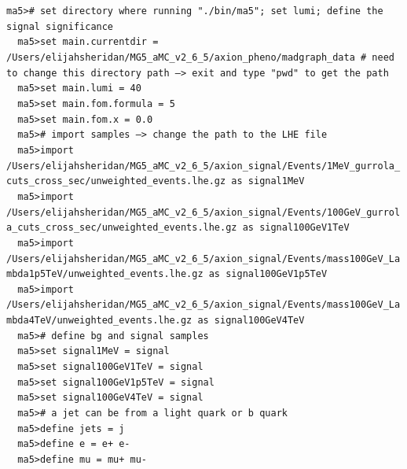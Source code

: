 \documentclass[a4paper, 10pt]{article}
\begin{document}
\texttt{ma5>\# set directory where running "./\-bin/\-ma5"; set lumi; define the signal significance\\
}
\texttt{ }\texttt{ }\texttt{ma5>set main.currentdir = /\-Users/\-elijahsheridan/\-MG5\_aMC\_v2\_6\_5/\-axion\_pheno/\-madgraph\_data \# need to change this directory path --> exit and type "pwd" to get the path\\
}
\texttt{ }\texttt{ }\texttt{ma5>set main.lumi = 40\\
}
\texttt{ }\texttt{ }\texttt{ma5>set main.fom.formula = 5\\
}
\texttt{ }\texttt{ }\texttt{ma5>set main.fom.x = 0.0\\
}
\texttt{ }\texttt{ }\texttt{ma5>\# import samples --> change the path to the LHE file\\
}
\texttt{ }\texttt{ }\texttt{ma5>import /\-Users/\-elijahsheridan/\-MG5\_aMC\_v2\_6\_5/\-axion\_signal/\-Events/\-1MeV\_gurrola\_cuts\_cross\_sec/\-unweighted\_events.lhe.gz as signal1MeV\\
}
\texttt{ }\texttt{ }\texttt{ma5>import /\-Users/\-elijahsheridan/\-MG5\_aMC\_v2\_6\_5/\-axion\_signal/\-Events/\-100GeV\_gurrola\_cuts\_cross\_sec/\-unweighted\_events.lhe.gz as signal100GeV1TeV\\
}
\texttt{ }\texttt{ }\texttt{ma5>import /\-Users/\-elijahsheridan/\-MG5\_aMC\_v2\_6\_5/\-axion\_signal/\-Events/\-mass100GeV\_Lambda1p5TeV/\-unweighted\_events.lhe.gz as signal100GeV1p5TeV\\
}
\texttt{ }\texttt{ }\texttt{ma5>import /\-Users/\-elijahsheridan/\-MG5\_aMC\_v2\_6\_5/\-axion\_signal/\-Events/\-mass100GeV\_Lambda4TeV/\-unweighted\_events.lhe.gz as signal100GeV4TeV\\
}
\texttt{ }\texttt{ }\texttt{ma5>\# define bg and signal samples\\
}
\texttt{ }\texttt{ }\texttt{ma5>set signal1MeV = signal\\
}
\texttt{ }\texttt{ }\texttt{ma5>set signal100GeV1TeV = signal\\
}
\texttt{ }\texttt{ }\texttt{ma5>set signal100GeV1p5TeV = signal\\
}
\texttt{ }\texttt{ }\texttt{ma5>set signal100GeV4TeV = signal\\
}
\texttt{ }\texttt{ }\texttt{ma5>\# a jet can be from a light quark or b quark\\
}
\texttt{ }\texttt{ }\texttt{ma5>define jets = j\\
}
\texttt{ }\texttt{ }\texttt{ma5>define e = e+ e-\\
}
\texttt{ }\texttt{ }\texttt{ma5>define mu = mu+ mu-\\
}
\end{document}
